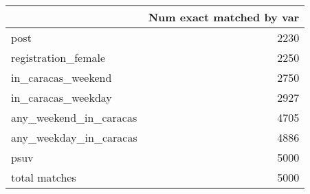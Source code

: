 \begin{tabular}{lr}
\toprule
{} &  Num exact matched by var \\
\midrule
post                   &                      2230 \\
registration\_female    &                      2250 \\
in\_caracas\_weekend     &                      2750 \\
in\_caracas\_weekday     &                      2927 \\
any\_weekend\_in\_caracas &                      4705 \\
any\_weekday\_in\_caracas &                      4886 \\
psuv                   &                      5000 \\
total matches          &                      5000 \\
\bottomrule
\end{tabular}
